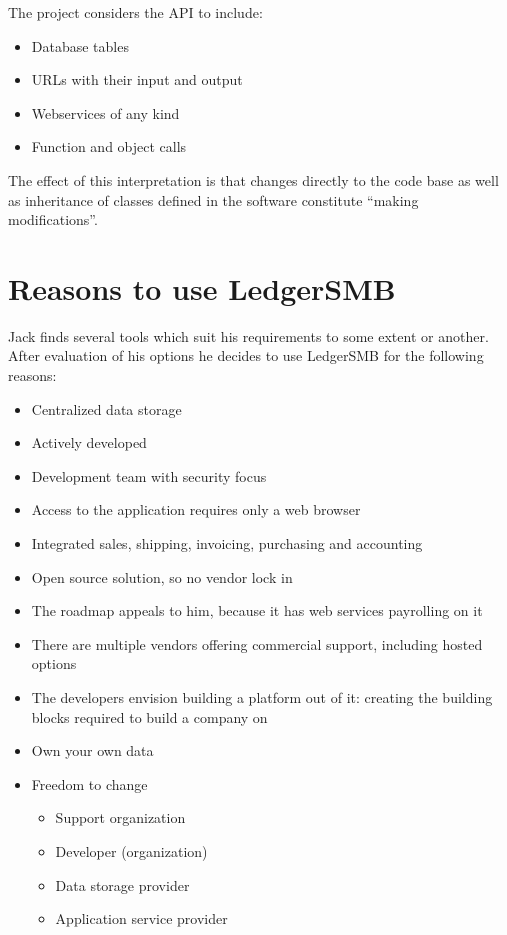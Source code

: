 The project considers the \acrshort{API} to include:
\begin{itemize}
\item Database tables
\item URLs with their input and output
\item Webservices of any kind
\item Function and object calls
\end{itemize}

The effect of this interpretation is that changes directly to the code base as well as inheritance of classes defined in the software constitute ``making modifications''.

\chapter{Reasons to use LedgerSMB}
\label{cha-advocacy}

Jack finds several tools which suit his requirements to some extent or another.
After evaluation of his options he decides to use LedgerSMB for the following reasons:

\begin{itemize}
\item Centralized data storage
\item Actively developed
\item Development team with security focus
\item Access to the application requires only a web browser
\item Integrated sales, shipping, invoicing, purchasing and accounting
\item Open source solution, so no vendor lock in
\item The roadmap appeals to him, because it has web services payrolling on it
\item There are multiple vendors offering commercial support, including hosted options
\item The developers envision building a platform out of it: creating the building blocks
required to build a company on
\end{itemize}


\begin{itemize}
\item Own your own data
\item Freedom to change
        \begin{itemize}
        \item Support organization
        \item Developer (organization)
        \item Data storage provider
        \item Application service provider
        \end{itemize}
\end{itemize}

